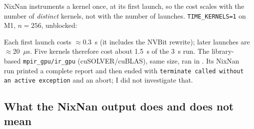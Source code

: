 \documentclass[11pt,a4paper]{article}
\begin{document}
NixNan instruments a kernel once, at its first launch, so the cost scales with the number of \emph{distinct} kernels, not with the number of launches. \texttt{TIME\_KERNELS=1} on M1, $n=256$, unblocked:



Each first launch costs $\approx$0.3~s (it includes the NVBit rewrite); later launches are $\approx$20~$\mu$s. Five kernels therefore cost about 1.5~s of the 3~s run.
The library-based \texttt{mpir\_gpu/ir\_gpu} (cuSOLVER/cuBLAS), same size, ran in . Its NixNan run printed a complete report and then ended with
\texttt{terminate called without an active exception} and an abort; I did not investigate that.

\subsection{What the NixNan output does and does not mean}\label{sec:caveats}
\end{document}
